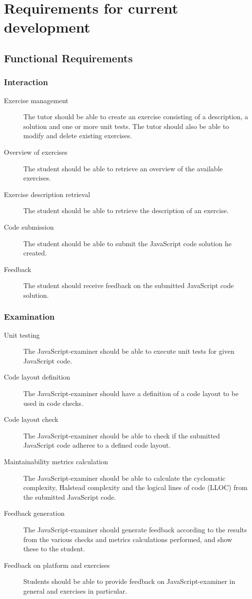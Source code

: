 
\section{Requirements for current development}
\subsection{Functional Requirements}
\subsubsection{Interaction}
\begin{description}
  \item[Exercise management] The tutor should be able to create an exercise
    consisting of a description, a solution and one or more unit tests. The
    tutor should also be able to modify and delete existing exercises.
  \item[Overview of exercises] The student should be able to retrieve an
    overview of the available exercises.
  \item[Exercise description retrieval] The student should be able to retrieve
    the description of an exercise.
  \item[Code submission] The student should be able to submit the JavaScript
    code solution he created.
  \item[Feedback] The student should receive feedback on the submitted
    JavaScript code solution.
\end{description}

\subsubsection{Examination}
\begin{description}
  \item[Unit testing] The JavaScript-examiner should be able to execute unit 
    tests for given JavaScript code.
  \item[Code layout definition] The JavaScript-examiner should have a
    definition of a code layout to be used in code checks.
  \item[Code layout check] The JavaScript-examiner should be able to check if 
    the submitted JavaScript code adheres to a defined code layout.
  \item[Maintainability metrics calculation] The JavaScript-examiner should be 
    able to calculate the cyclomatic complexity, Halstead complexity and the 
    logical lines of code (LLOC) from the submitted JavaScript code.
  \item[Feedback generation] The JavaScript-examiner should generate feedback
    according to the results from the various checks and metrics calculations
    performed, and show these to the student.
  \item[Feedback on platform and exercises] Students should be able to provide
    feedback on JavaScript-examiner in general and exercises in particular.
\end{description}

